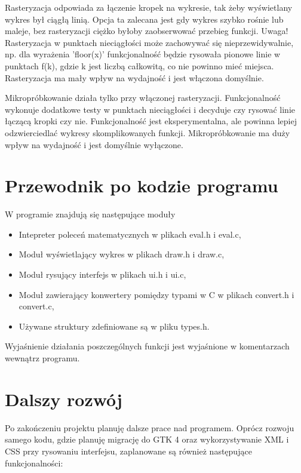 \documentclass[a4paper]{article}
\begin{document}
Rasteryzacja odpowiada za łączenie kropek na wykresie, tak żeby wyświetlany wykres był ciągłą linią. Opcja ta zalecana jest gdy wykres szybko rośnie lub maleje, bez rasteryzacji ciężko byłoby zaobserwować przebieg funkcji. 
Uwaga! Rasteryzacja w punktach nieciągłości może zachowywać się nieprzewidywalnie, np. dla wyrażenia 'floor(x)' funkcjonalność będzie rysowała pionowe linie w punktach f(k), gdzie k jest liczbą całkowitą, co nie powinno mieć miejsca.
Rasteryzacja ma mały wpływ na wydajność i jest włączona domyślnie.

Mikropróbkowanie działa tylko przy włączonej rasteryzacji. Funkcjonalność wykonuje dodatkowe testy w punktach nieciągłości i decyduje czy rysować linie łączącą kropki czy nie. Funkcjonalność jest eksperymentalna, ale powinna lepiej odzwierciedlać wykresy skomplikowanych funkcji.
Mikropróbkowanie ma duży wpływ na wydajność i jest domyślnie wyłączone.

\section{Przewodnik po kodzie programu}

W programie znajdują się następujące moduły
\begin{itemize}
    \item Intepreter poleceń matematycznych w plikach eval.h i eval.c,
    \item Moduł wyświetlający wykres w plikach draw.h i draw.c,
    \item Moduł rysujący interfejs w plikach ui.h i ui.c,
    \item Moduł zawierający konwertery pomiędzy typami w C w plikach convert.h i convert.c,
    \item Używane struktury zdefiniowane są w pliku types.h.
\end{itemize}

Wyjaśnienie działania poszczególnych funkcji jest wyjaśnione w komentarzach wewnątrz programu.

\section{Dalszy rozwój}

Po zakończeniu projektu planuję dalsze prace nad programem. Oprócz rozwoju samego kodu, gdzie planuję migrację do GTK 4 oraz wykorzystywanie XML i CSS przy rysowaniu interfejsu, zaplanowane są również następujące funkcjonalności:
\end{document}
